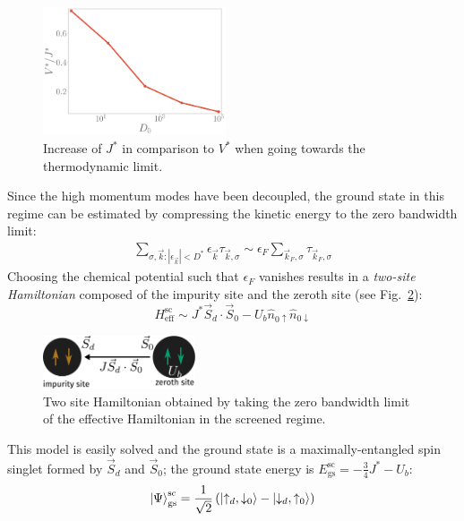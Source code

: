\documentclass[reprint,superscriptaddress,floatfix]{revtex4-2}
\begin{document}
\begin{figure}[!htb]
	\centering
	\includegraphics[width=0.48\textwidth]{J_bandwidth.pdf}
	\caption{Increase of \(J^*\) in comparison to \(V^*\) when going towards the thermodynamic limit.}
	\label{J_bandwidth}
\end{figure}

Since the high momentum modes have been decoupled, the ground state in this regime can be estimated by compressing the kinetic energy to the zero bandwidth limit: 
\begin{equation}\begin{aligned}
	\sum_{\sigma,\vec k:|\epsilon_{\vec k}| < D^*} \epsilon_{\vec k} \tau_{\vec k,\sigma} \sim \epsilon_F \sum_{\vec k_F,\sigma}\tau_{\vec k_F,\sigma}
\end{aligned}\end{equation}
Choosing the chemical potential such that \(\epsilon_F\) vanishes results in a {\it two-site Hamiltonian} composed of the impurity site and the zeroth site (see Fig.~\ref{zero-bw}):
\begin{equation}
	\label{two-site}
	H_\text{eff}^\text{sc} \sim J^* \vec{S}_d\cdot\vec{S}_0 - U_b \hat n_{0 \uparrow} \hat n_{0 \downarrow}
\end{equation}
\begin{figure}[!htb]
	\centering
	\includegraphics[width=0.4\textwidth]{zeromode_eff.pdf}
	\caption{Two site Hamiltonian obtained by taking the zero bandwidth limit of the effective Hamiltonian in the screened regime.}
	\label{zero-bw}
\end{figure}
This model is easily solved and the ground state is a maximally-entangled spin singlet formed by \(\vec S_d\) and \(\vec S_0\); the ground state energy is \(E_\text{gs}^\text{sc} = -\frac{3}{4}J^* - U_b\):
\begin{equation}\begin{aligned}
	\ket{\Psi}_\text{gs}^\text{sc} = \frac{1}{\sqrt 2}\left(\ket{\uparrow_d,\downarrow_0} - \ket{\downarrow_d,\uparrow_0}\right)
\end{aligned}\end{equation}
\end{document}
